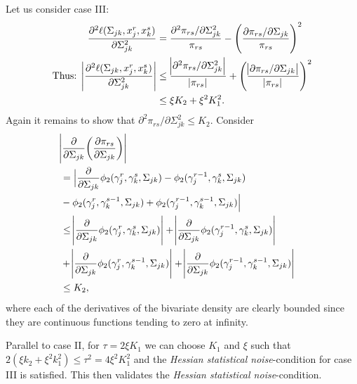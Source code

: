 \begin{condition}
    Let us consider case III:
    \begin{equation}\label{hessian_case3}
        \begin{split}
            \frac{\partial^2 \ell(\Sigma_{jk}, x_j^r,x_k^s)}{\partial \Sigma_{jk}^{2}} &= \frac{\partial^2 \pi_{rs}/\partial \Sigma_{jk}^{2}}{\pi_{rs}} - \Bigg(\frac{\partial \pi_{rs}/\partial \Sigma_{jk}}{\pi_{rs}}\Bigg)^2 \\
            \text{Thus: } \abs{\frac{\partial^2 \ell(\Sigma_{jk}, x_j^r,x_k^s)}{\partial \Sigma_{jk}^{2}}} &\leq \frac{\abs{\partial^2 \pi_{rs}/\partial \Sigma_{jk}^{2}}}{\abs{\pi_{rs}}} + \Bigg(\frac{\abs{\partial \pi_{rs}/\partial \Sigma_{jk}}}{\abs{\pi_{rs}}} \Bigg)^2 \\ 
            &\leq \xi K_2 + \xi^2K_1^2.
        \end{split}
    \end{equation}
    Again it remains to show that $\partial^2 \pi_{rs}/\partial \Sigma_{jk}^{2} \leq K_2$. Consider
    \begin{equation*}
        \begin{split}
        \lefteqn{\abs{\frac{\partial}{\partial \Sigma_{jk}}\bigg(\frac{\partial \pi_{rs}}{\partial \Sigma_{jk}}\bigg)}} \\
        &= \Big\lvert \frac{\partial}{\partial \Sigma_{jk}}\phi_2({\gamma}_j^r, {\gamma}_k^s, \Sigma_{jk}) - \phi_2({\gamma}_j^{r-1}, {\gamma}_k^s, \Sigma_{jk}) \\
        &- \phi_2({\gamma}_j^r, {\gamma}_k^{s-1}, \Sigma_{jk}) + \phi_2({\gamma}_j^{r-1}, {\gamma}_k^{s-1}, \Sigma_{jk})\Big\rvert \\
        &\leq \abs{\frac{\partial}{\partial \Sigma_{jk}}\phi_2({\gamma}_j^r, {\gamma}_k^s, \Sigma_{jk})} + \abs{\frac{\partial}{\partial \Sigma_{jk}}\phi_2({\gamma}_j^{r-1}, {\gamma}_k^s, \Sigma_{jk})} \\
        &+ \abs{\frac{\partial}{\partial \Sigma_{jk}}\phi_2({\gamma}_j^r, {\gamma}_k^{s-1}, \Sigma_{jk})} + \abs{\frac{\partial}{\partial \Sigma_{jk}}\phi_2({\gamma}_j^{r-1}, {\gamma}_k^{s-1}, \Sigma_{jk})} \\
        &\leq K_2,
        \end{split}
    \end{equation*}
    where each of the derivatives of the bivariate density are clearly bounded since they are continuous functions tending to zero at infinity.
    
    Parallel to case II, for $\tau = 2\xi K_1$ we can choose $K_1$ and $\xi$ such that $2(\xi k_2 + \xi^2 k_1^2) \leq \tau^2 = 4\xi^2 K_1^2$ and the \textit{Hessian statistical noise}-condition for case III is satisfied. This then validates the \textit{Hessian statistical noise}-condition. 
\end{condition} 

